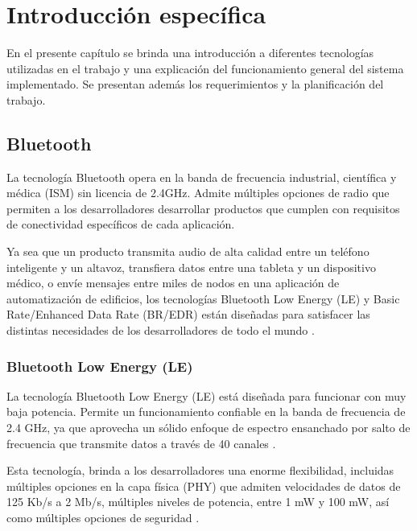 \chapter{Introducción específica} %

\label{Chapter2}

En el presente capítulo se brinda una introducción a diferentes tecnologías utilizadas en el trabajo y una explicación del funcionamiento general del sistema implementado. Se presentan además los requerimientos y la planificación del trabajo.

\section{Bluetooth}

La tecnología Bluetooth opera en la banda de frecuencia industrial, científica y médica (ISM) sin licencia de 2.4GHz. Admite múltiples opciones de radio que permiten a los desarrolladores desarrollar productos que cumplen con requisitos de conectividad específicos de cada aplicación. 

Ya sea que un producto transmita audio de alta calidad entre un teléfono inteligente y un altavoz, transfiera datos entre una tableta y un dispositivo médico, o envíe mensajes entre miles de nodos en una aplicación de automatización de edificios, los tecnologías Bluetooth Low Energy (LE) y Basic Rate/Enhanced Data Rate (BR/EDR) están diseñadas para satisfacer las distintas necesidades de los desarrolladores de todo el mundo \cite{bluetooth}.


\subsection{Bluetooth Low Energy (LE)}

La tecnología Bluetooth Low Energy (LE) está diseñada para funcionar con muy baja potencia. Permite un funcionamiento confiable en la banda de frecuencia de 2.4 GHz, ya que aprovecha un sólido enfoque de espectro ensanchado por salto de frecuencia que transmite datos a través de 40 canales \cite{bluetooth}.

Esta tecnología, brinda a los desarrolladores una enorme flexibilidad, incluidas múltiples opciones en la capa física (PHY) que admiten velocidades de datos de 125 Kb/s a 2 Mb/s, múltiples niveles de potencia, entre 1 mW y 100 mW, así como múltiples opciones de seguridad \cite{bluetooth}. 

